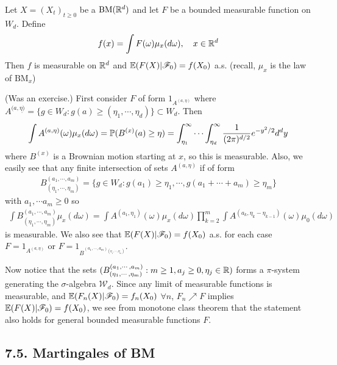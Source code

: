 \documentclass[10pt,a4paper]{report}
\newenvironment{proof}
{\begin{changemargin}{1cm}{0.5cm} 
	}%
	{\end{changemargin}
}
\begin{document}
 Let $X = (X_t)_{t\geq 0}$ be a $\text{BM}(\mathbb{R}^d)$ and let $F$ be a bounded measurable function on $W_d$. Define
\begin{align*}
f(x) = \int F(\omega) \mu_x (d\omega), \quad x\in \mathbb{R}^d
\end{align*}
Then $f$ is measurable on $\mathbb{R}^d$ and $\mathbb{E}(F(X) |\mathscr{F}_0)  = f(X_0)$ a.s. (recall, $\mu_x$ is the law of $\text{BM}_x$)
\begin{proof}
\pf (Was an exercise.) First consider $F$ of form $1_{A^{(a,\eta)}}$ where $A^{(a,\underline{\eta)} } = \{ g \in W_d : g(a) \geq (\eta_1, \cdots, \eta_d ) \} \subset W_d$. Then
\begin{align*}
\int A^{(a,\eta)}(\omega) \mu_x( d\omega) = \mathbb{P} ( B^{(x)} (a) \geq \eta) = \int_{\eta_1}^{\infty} \cdots \int_{\eta_d}^{\infty} \frac{1}{(2\pi)^{d/2}}e^{-y^2 /2} d^d y
\end{align*}
where $B^{(x)}$ is a Brownian motion starting at $x$, so this is measurable. Also, we easily see that any finite intersection of sets $A^{(a,\eta)}$ if of form
\begin{align*}
B^{(a_1, \cdots, a_m)}_{(\eta_1, \cdots, \eta_m)} = \{ g \in W_d : g(a_1) \geq \eta_1, \cdots, g(a_1 + \cdots + a_m) \geq \eta_m \}
\end{align*}
with $a_1, \cdots a_m \geq 0$ so
\begin{align*}
\int B^{(a_1, \cdots, a_m)}_{(\eta_1, \cdots, \eta_m)} \mu_x( d\omega) =  \int A^{(a_1,\eta_1)}(\omega) \mu_x( d\omega) \prod_{k=2}^m \int A^{(a_k,\eta_{k} - \eta_{k-1})}(\omega) \mu_0( d\omega)
\end{align*}
is measurable. We also see that $\mathbb{E}(F(X) | \mathscr{F}_0 ) = f(X_0)$ a.s. for each case $F = 1_{A^{(a,\eta)}}$ or $F = 1_{B^{(a_1, \cdots, a_m)_{(\eta_1, \cdots, \eta_m)}}}$.

\quad Now notice that the sets $(B^{(a_1, \cdots, a_m)}_{(\eta_1, \cdots, \eta_m)} : m\geq 1, a_j \geq 0, \eta_j \in \mathbb{R})$ forms a $\pi$-system generating the $\sigma$-algebra $\mathscr{W}_d$. Since any limit of measurable functions is measurable, and $\mathbb{E}(F_n(X) | \mathscr{F}_0 ) = f_n(X_0)$ $\forall n$, $F_n \nearrow F$ implies $\mathbb{E}(F(X) | \mathscr{F}_0 ) = f(X_0)$, we see from monotone class theorem that the statement also holds for general bounded measurable functions $F$.

\eop
\end{proof}
\s

\subsection*{7.5. Martingales of BM}
\end{document}
